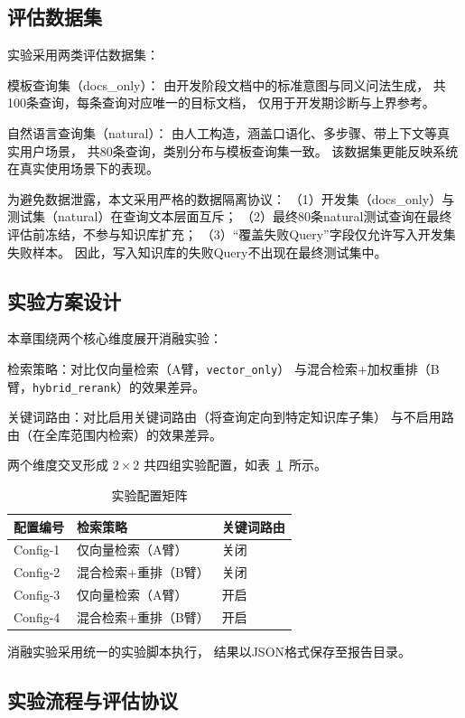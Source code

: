 \subsection{评估数据集}

实验采用两类评估数据集：

模板查询集（docs\_only）：
由开发阶段文档中的标准意图与同义问法生成，
共100条查询，每条查询对应唯一的目标文档，
仅用于开发期诊断与上界参考。

自然语言查询集（natural）：
由人工构造，涵盖口语化、多步骤、带上下文等真实用户场景，
共80条查询，类别分布与模板查询集一致。
该数据集更能反映系统在真实使用场景下的表现。

为避免数据泄露，本文采用严格的数据隔离协议：
（1）开发集（docs\_only）与测试集（natural）在查询文本层面互斥；
（2）最终80条natural测试查询在最终评估前冻结，不参与知识库扩充；
（3）“覆盖失败Query”字段仅允许写入开发集失败样本。
因此，写入知识库的失败Query不出现在最终测试集中。

\subsection{实验方案设计}

本章围绕两个核心维度展开消融实验：

检索策略：对比仅向量检索（A臂，\texttt{vector\_only}）
与混合检索+加权重排（B臂，\texttt{hybrid\_rerank}）的效果差异。

关键词路由：对比启用关键词路由（将查询定向到特定知识库子集）
与不启用路由（在全库范围内检索）的效果差异。

两个维度交叉形成 $2 \times 2$ 共四组实验配置，如表~\ref{tab:exp-configs}~所示。

\begin{table}[htbp]
\centering
\caption{实验配置矩阵}
\label{tab:exp-configs}
\begin{tabular}{lll}
\toprule
配置编号 & 检索策略 & 关键词路由 \\
\midrule
Config-1 & 仅向量检索（A臂） & 关闭 \\
Config-2 & 混合检索+重排（B臂） & 关闭 \\
Config-3 & 仅向量检索（A臂） & 开启 \\
Config-4 & 混合检索+重排（B臂） & 开启 \\
\bottomrule
\end{tabular}
\end{table}

消融实验采用统一的实验脚本执行，
结果以JSON格式保存至报告目录。

\subsection{实验流程与评估协议}

